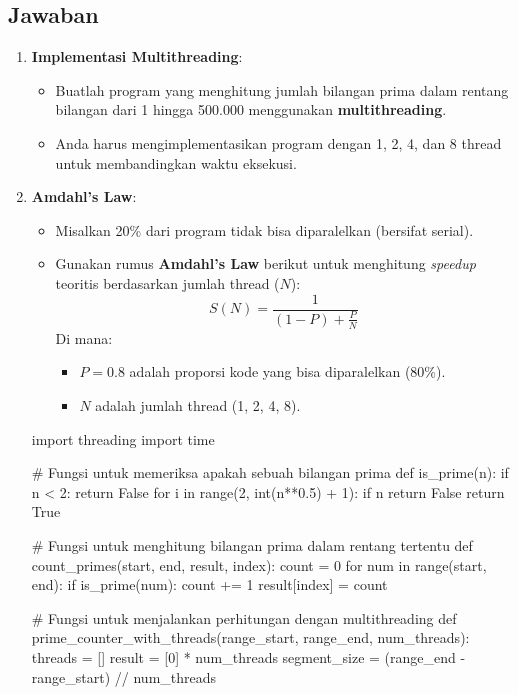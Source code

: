 \documentclass[12pt]{article}
\begin{document}
\subsection*{Jawaban}
\begin{enumerate}
    \item \textbf{Implementasi Multithreading}:
    \begin{itemize}
        \item Buatlah program yang menghitung jumlah bilangan prima dalam rentang bilangan dari 1 hingga 500.000 menggunakan \textbf{multithreading}.
        \item Anda harus mengimplementasikan program dengan 1, 2, 4, dan 8 thread untuk membandingkan waktu eksekusi.
    \end{itemize}

    \item \textbf{Amdahl's Law}:
    \begin{itemize}
        \item Misalkan 20\% dari program tidak bisa diparalelkan (bersifat serial).
        \item Gunakan rumus \textbf{Amdahl's Law} berikut untuk menghitung \textit{speedup} teoritis berdasarkan jumlah thread (\(N\)):
        \[
        S(N) = \frac{1}{(1 - P) + \frac{P}{N}}
        \]
        Di mana:
        \begin{itemize}
            \item \(P = 0.8\) adalah proporsi kode yang bisa diparalelkan (80\%).
            \item \(N\) adalah jumlah thread (1, 2, 4, 8).
        \end{itemize}
    \end{itemize}

    \begin{python}
        import threading
import time

# Fungsi untuk memeriksa apakah sebuah bilangan prima
def is_prime(n):
    if n < 2:
        return False
    for i in range(2, int(n**0.5) + 1):
        if n %
            return False
    return True

# Fungsi untuk menghitung bilangan prima dalam rentang tertentu
def count_primes(start, end, result, index):
    count = 0
    for num in range(start, end):
        if is_prime(num):
            count += 1
    result[index] = count

# Fungsi untuk menjalankan perhitungan dengan multithreading
def prime_counter_with_threads(range_start, range_end, num_threads):
    threads = []
    result = [0] * num_threads
    segment_size = (range_end - range_start) // num_threads


\end{python}
\end{enumerate}
\end{document}
